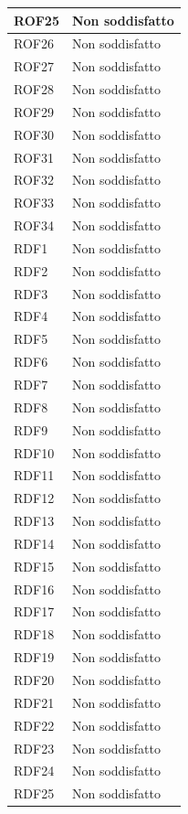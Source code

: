 \begin{longtable}{| p{2.5cm} | p{3cm} |}
	ROF25 & Non soddisfatto \\ \hline
	ROF26 & Non soddisfatto \\ \hline
	ROF27 & Non soddisfatto \\ \hline
	ROF28 & Non soddisfatto \\ \hline
	ROF29 & Non soddisfatto \\ \hline
	ROF30 & Non soddisfatto \\ \hline
	ROF31 & Non soddisfatto \\ \hline
	ROF32 & Non soddisfatto \\ \hline
	ROF33 & Non soddisfatto \\ \hline
	ROF34 & Non soddisfatto \\ \hline
	RDF1 & Non soddisfatto \\ \hline
	RDF2 & Non soddisfatto \\ \hline
	RDF3 & Non soddisfatto \\ \hline
	RDF4 & Non soddisfatto \\ \hline
	RDF5 & Non soddisfatto \\ \hline
	RDF6 & Non soddisfatto \\ \hline
	RDF7 & Non soddisfatto \\ \hline
	RDF8 & Non soddisfatto \\ \hline
	RDF9 & Non soddisfatto \\ \hline
	RDF10 & Non soddisfatto \\ \hline
	RDF11 & Non soddisfatto \\ \hline
	RDF12 & Non soddisfatto \\ \hline
	RDF13 & Non soddisfatto \\ \hline
	RDF14 & Non soddisfatto \\ \hline
	RDF15 & Non soddisfatto \\ \hline
	RDF16 & Non soddisfatto \\ \hline
	RDF17 & Non soddisfatto \\ \hline
	RDF18 & Non soddisfatto \\ \hline
	RDF19 & Non soddisfatto \\ \hline
	RDF20 & Non soddisfatto \\ \hline
	RDF21 & Non soddisfatto \\ \hline
	RDF22 & Non soddisfatto \\ \hline
	RDF23 & Non soddisfatto \\ \hline
	RDF24 & Non soddisfatto \\ \hline
	RDF25 & Non soddisfatto \\ \hline

\end{longtable}
